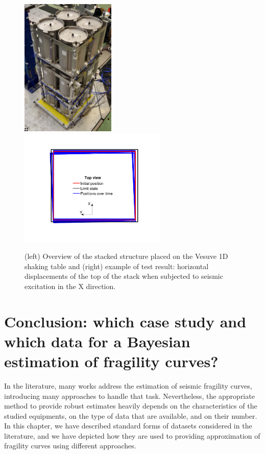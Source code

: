     \begin{figure}[h]
		\centering		
		\includegraphics[width=4.5cm]{figures/intro-frags/EDEN.jpg}
		\hspace{0.5cm}
		\includegraphics[width=7cm]{figures/intro-frags/EDEN_R169.pdf}
		\caption{(left) Overview of the stacked structure placed on the Vesuve 1D shaking table and (right) example of test result: horizontal displacements of the top of the stack when subjected to seismic excitation in the X direction.}
		\label{fig:intro-frags:EDEN}
	\end{figure}  


\section{Conclusion: which case study and which data for a Bayesian estimation of fragility curves?}\label{sec:intro-frags:conclusion}



In the literature, many works address the estimation of seismic fragility curves, introducing many approaches to handle that task.
Nevertheless, the appropriate method to provide robust estimates heavily depends on the characteristics of the studied equipments, on the 
type of data that are available, and on their number.
In this chapter, we have described standard forms of datasets considered in the literature, and we have depicted how they are used to providing approximation of fragility curves using different approaches.

